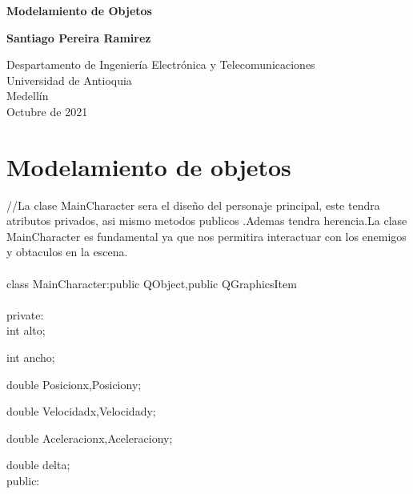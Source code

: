 \documentclass{article}
\begin{document}
\begin{titlepage}
    \begin{center}
        \vspace*{1cm}
            
        \Huge
        \textbf{Modelamiento de Objetos}
            
        \vspace{0.5cm}
        \LARGE
        
            
        \vspace{1.5cm}
            
        \textbf{Santiago Pereira Ramirez}
            
        \vfill
            
        \vspace{0.8cm}
            
        \Large
        Despartamento de Ingeniería Electrónica y Telecomunicaciones\\
        Universidad de Antioquia\\
        Medellín\\
        Octubre de 2021
            
    \end{center}
\end{titlepage}

\tableofcontents
\newpage
\section{Modelamiento de objetos}\label{intro}

//La clase MainCharacter sera el diseño del personaje principal, este tendra atributos privados, asi mismo metodos publicos .Ademas tendra herencia.La clase MainCharacter es fundamental ya que nos permitira interactuar con los enemigos y obtaculos en la escena.\\
\\
class MainCharacter:public QObject,public QGraphicsItem\\
\lbrace\\
private:\\

    int alto;
    
    int ancho;
    
    double Posicionx,Posiciony;
    
    double Velocidadx,Velocidady;
    
    double Aceleracionx,Aceleraciony;
    
    double delta;\\
public:\\
\end{document}
